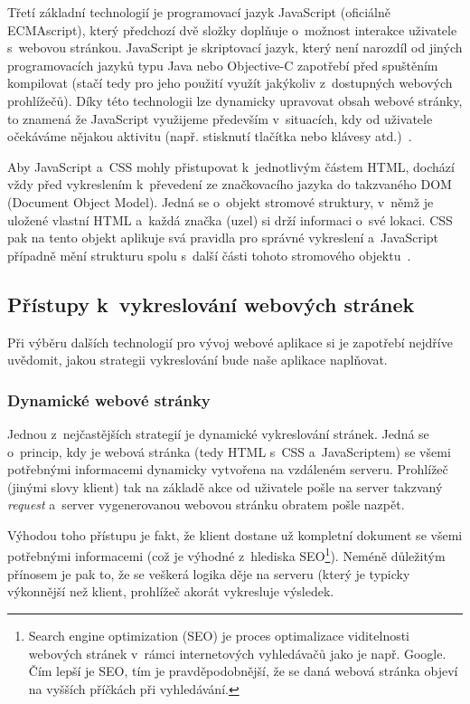 Třetí základní technologií je programovací jazyk JavaScript (oficiálně ECMAscript), který předchozí dvě složky doplňuje o~možnost interakce uživatele s~webovou stránkou. JavaScript je skriptovací jazyk, který není narozdíl od jiných programovacích jazyků typu Java nebo Objective-C zapotřebí před spuštěním kompilovat (stačí tedy pro jeho použití využít jakýkoliv z~dostupných webových prohlížečů). Díky této technologii lze dynamicky upravovat obsah webové stránky, to znamená že JavaScript využijeme především v~situacích, kdy od uživatele očekáváme nějakou aktivitu (např. stisknutí tlačítka nebo klávesy atd.)~\parencite{javascript}.

Aby JavaScript a~CSS mohly přistupovat k~jednotlivým částem HTML, dochází vždy před vykreslením k~převedení ze značkovacího jazyka do takzvaného DOM (Document Object Model). Jedná se o~objekt stromové struktury, v~němž je uložené vlastní HTML a~každá značka (uzel) si drží informaci o~své lokaci. CSS pak na tento objekt aplikuje svá pravidla pro správné vykreslení a~JavaScript případně mění strukturu spolu s~další části tohoto stromového objektu~\parencite{howbrowserswork}.

\hypertarget{pux159uxedstupy-k-vykreslovuxe1nuxed-webovuxfdch-struxe1nek}{%
\subsection{Přístupy k~vykreslování webových stránek}\label{pux159uxedstupy-k-vykreslovuxe1nuxed-webovuxfdch-struxe1nek}}

Při výběru dalších technologií pro vývoj webové aplikace si je zapotřebí nejdříve uvědomit, jakou strategii vykreslování bude naše aplikace naplňovat.

\hypertarget{dynamickuxe9-webovuxe9-struxe1nky}{%
\subsubsection{Dynamické webové stránky}\label{dynamickuxe9-webovuxe9-struxe1nky}}

Jednou z~nejčastějších strategií je dynamické vykreslování stránek. Jedná se o~princip, kdy je webová stránka (tedy HTML s~CSS a~JavaScriptem) se všemi potřebnými informacemi dynamicky vytvořena na vzdáleném serveru. Prohlížeč (jinými slovy klient) tak na základě akce od uživatele pošle na server takzvaný \emph{request} a~server vygenerovanou webovou stránku obratem pošle nazpět.

Výhodou toho přístupu je fakt, že klient dostane už kompletní dokument se všemi potřebnými informacemi (což je výhodné z~hlediska SEO\footnote{Search engine optimization (SEO) je proces optimalizace viditelnosti webových stránek v~rámci internetových vyhledávačů jako je např. Google. Čím lepší je SEO, tím je pravděpodobnější, že se daná webová stránka objeví na vyšších příčkách při vyhledávání.}). Neméně důležitým přínosem je pak to, že se veškerá logika děje na serveru (který je typicky výkonnější než klient, prohlížeč akorát vykresluje výsledek.

